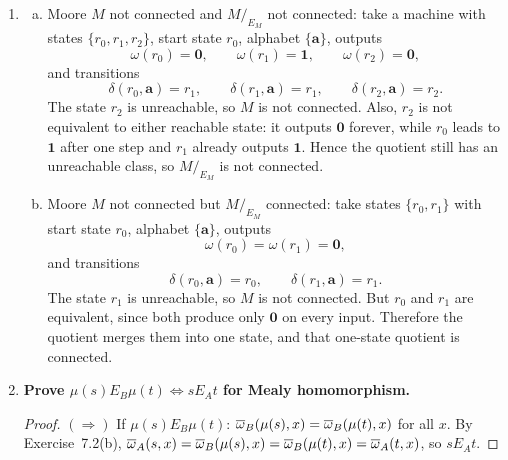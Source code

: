 \begin{enumerate}[{7.}1.]
\begin{enumerate}[(a)]
  \item Mealy $M$ not connected but $M/_{E_M}$ connected: take
  \[
    M=\langle \{\pmb{a}\},\{\pmb{0}\},\{t_0,t_1,t_2\},t_0,\delta,\omega\rangle
  \]
  where every state loops on $\pmb{a}$ and always outputs $\pmb{0}$:
  \[
    \delta(t_j,\pmb{a})=t_j,\qquad \omega(t_j,\pmb{a})=\pmb{0}
    \qquad (j=0,1,2).
  \]
  The states $t_1$ and $t_2$ are unreachable from $t_0$, so $M$ is not
  connected.  But all three states are equivalent, since every input word
  produces the same output word $\pmb{0}^{|x|}$ no matter where we start.
  Therefore
  \[
    [t_0]=[t_1]=[t_2],
  \]
  so $M/_{E_M}$ has just one state and is therefore connected.
\end{enumerate}

\item \begin{enumerate}[(a)]
  \item Moore $M$ not connected and $M/_{E_M}$ not connected: take a machine
  with states $\{r_0,r_1,r_2\}$, start state $r_0$, alphabet $\{\pmb{a}\}$,
  outputs
  \[
    \omega(r_0)=\pmb{0},\qquad \omega(r_1)=\pmb{1},\qquad \omega(r_2)=\pmb{0},
  \]
  and transitions
  \[
    \delta(r_0,\pmb{a})=r_1,\qquad
    \delta(r_1,\pmb{a})=r_1,\qquad
    \delta(r_2,\pmb{a})=r_2.
  \]
  The state $r_2$ is unreachable, so $M$ is not connected.  Also, $r_2$ is not
  equivalent to either reachable state: it outputs $\pmb{0}$ forever, while
  $r_0$ leads to $\pmb{1}$ after one step and $r_1$ already outputs $\pmb{1}$.
  Hence the quotient still has an unreachable class, so $M/_{E_M}$ is not
  connected.

  \item Moore $M$ not connected but $M/_{E_M}$ connected: take states
  $\{r_0,r_1\}$ with start state $r_0$, alphabet $\{\pmb{a}\}$, outputs
  \[
    \omega(r_0)=\omega(r_1)=\pmb{0},
  \]
  and transitions
  \[
    \delta(r_0,\pmb{a})=r_0,\qquad \delta(r_1,\pmb{a})=r_1.
  \]
  The state $r_1$ is unreachable, so $M$ is not connected.  But $r_0$ and $r_1$
  are equivalent, since both produce only $\pmb{0}$ on every input.  Therefore
  the quotient merges them into one state, and that one-state quotient is
  connected.
\end{enumerate}

\item \textbf{Prove $\mu(s) E_B \mu(t) \Leftrightarrow s E_A t$ for Mealy homomorphism.}

\begin{proof}
$(\Rightarrow)$ If $\mu(s) E_B \mu(t)$: $\overline{\omega}_B(\mu(s),x)=\overline{\omega}_B(\mu(t),x)$ for all $x$.  By Exercise~7.2(b), $\overline{\omega}_A(s,x)=\overline{\omega}_B(\mu(s),x)=\overline{\omega}_B(\mu(t),x)=\overline{\omega}_A(t,x)$, so $s E_A t$.


\end{proof}
\end{enumerate}
